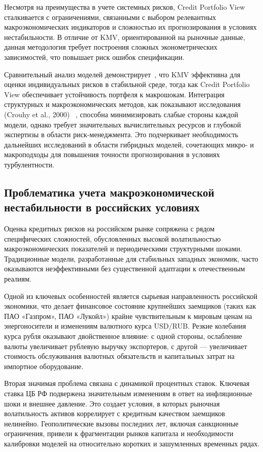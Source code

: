 \documentclass[]{article}
\begin{document}
	Несмотря на преимущества в учете системных рисков, Credit Portfolio View сталкивается с ограничениями,
	связанными с выбором релевантных макроэкономических индикаторов и сложностью их прогнозирования в условиях
	нестабильности. В отличие от KMV, ориентированной на рыночные данные, данная методология требует построения
	сложных эконометрических зависимостей, что повышает риск ошибок спецификации.

	Сравнительный анализ моделей демонстрирует~\cite{crouhy2000}, что KMV эффективна для оценки индивидуальных
	рисков в стабильной среде, тогда как Credit Portfolio View обеспечивает устойчивость портфеля к макрошокам.
	Интеграция структурных и макроэкономических методов, как показывают исследования (Crouhy et al., 2000)
	~\cite{crouhy2000}, способна минимизировать слабые стороны каждой модели, однако требует значительных
	вычислительных ресурсов и глубокой экспертизы в области риск-менеджмента. Это подчеркивает необходимость
	дальнейших исследований в области гибридных моделей, сочетающих микро- и макроподходы для повышения точности
	прогнозирования в условиях турбулентности.

	\subsection{Проблематика учета макроэкономической нестабильности в российских условиях}

	Оценка кредитных рисков на российском рынке сопряжена с рядом специфических сложностей, обусловленных высокой
	волатильностью макроэкономических показателей и периодическими структурными шоками. Традиционные модели,
	разработанные для стабильных западных экономик, часто оказываются неэффективными без существенной адаптации к
	отечественным реалиям.

	Одной из ключевых особенностей является сырьевая направленность российской экономики, что делает финансовое
	состояние крупнейших заемщиков (таких как ПАО «Газпром», ПАО «Лукойл») крайне чувствительным к мировым ценам на
	энергоносители и изменениям валютного курса USD/RUB. Резкие колебания курса рубля оказывают двойственное влияние:
	с одной стороны, ослабление валюты увеличивает рублевую выручку экспортеров, с другой — увеличивает стоимость
	обслуживания валютных обязательств и капитальных затрат на импортное оборудование.

	Вторая значимая проблема связана с динамикой процентных ставок. Ключевая ставка ЦБ РФ подвержена значительным
	изменениям в ответ на инфляционные шоки и внешнее давление. Это создает условия, в которых рыночная волатильность
	активов коррелирует с кредитным качеством заемщиков нелинейно. Геополитические вызовы последних лет, включая
	санкционные ограничения, привели к фрагментации рынков капитала и необходимости калибровки моделей на относительно
	коротких и зашумленных временных рядах.
\end{document}
